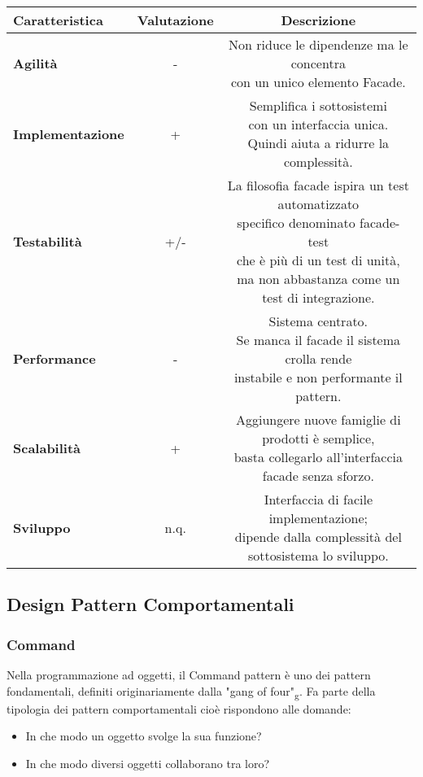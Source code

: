{{{\begin{itemize}
				\small %
				{\renewcommand\arraystretch{1.2} %
					\begin{center} \begin{tabular}{|l|c|c|}
						\hline
						{\textbf{Caratteristica}}&{\textbf{Valutazione}}&{\textbf{Descrizione}}\\
						\hline
						\textbf{Agilità} & - &  \minitab[c]{Non riduce le dipendenze ma le concentra\\ con un unico elemento Facade.} \\
						\hline
						\textbf{Implementazione} & + &  \minitab[c]{Semplifica i sottosistemi\\ con un interfaccia unica.\\Quindi aiuta a ridurre la complessità.}  \\
						\hline
						\textbf{Testabilità} & +/- &  \minitab[c]{La filosofia facade ispira un test automatizzato\\specifico denominato facade-test\\che è più di un test di unità,\\ma non abbastanza come un test di integrazione.} \\
						\hline
						\textbf{Performance} & - & \minitab[c]{Sistema centrato.\\Se manca il facade il sistema crolla rende\\instabile e non performante il pattern.}\\
						\hline
						\textbf{Scalabilità} & + & \minitab[c]{Aggiungere nuove famiglie di prodotti è semplice,\\basta collegarlo all'interfaccia facade senza sforzo.}\\
						\hline
						\textbf{Sviluppo} & n.q. &  \minitab[c]{Interfaccia di facile implementazione;\\dipende dalla complessità del sottosistema lo sviluppo.}\\
						\hline
					\end{tabular} \end{center}
				}
			\end{itemize}
		}
	}
	\subsection{Design Pattern Comportamentali}{
		\subsubsection{Command}{
			Nella programmazione ad oggetti, il Command pattern è uno dei pattern fondamentali, definiti originariamente dalla "gang of four"\textsubscript{g}. Fa parte della tipologia dei pattern comportamentali cioè rispondono alle domande: 
			\begin{itemize}
				\item In che modo un oggetto svolge la sua funzione?
				\item In che modo diversi oggetti collaborano tra loro?
			\end{itemize}
		
}}}
